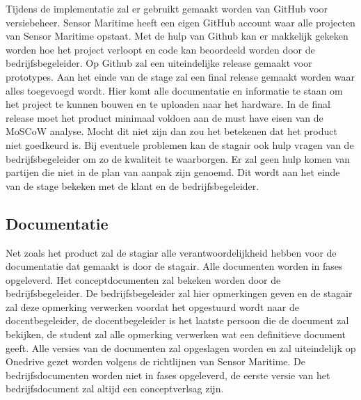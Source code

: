 \noindent Tijdens de implementatie zal er gebruikt gemaakt worden van GitHub voor versiebeheer. Sensor Maritime heeft een eigen GitHub account waar alle projecten van Sensor Maritime opstaat. Met de hulp van Github kan er makkelijk gekeken worden hoe het project verloopt en code kan beoordeeld worden door de bedrijfsbegeleider. Op Github zal een uiteindelijke release gemaakt voor prototypes. Aan het einde van de stage zal een final release gemaakt worden waar alles toegevoegd wordt. Hier komt alle documentatie en informatie te staan om het project te kunnen bouwen en te uploaden naar het hardware. In de final release moet het product minimaal voldoen aan de must have eisen van de MoSCoW analyse. Mocht dit niet zijn dan zou het betekenen dat het product niet goedkeurd is. Bij eventuele problemen kan de stagair ook hulp vragen van de bedrijfsbegeleider om zo de kwaliteit te waarborgen. Er zal geen hulp komen van partijen die niet in de plan van aanpak zijn genoemd. Dit wordt aan het einde van de stage bekeken met de klant en de bedrijfsbegeleider.

\subsection{Documentatie}
Net zoals het product zal de stagiar alle verantwoordelijkheid hebben voor de documentatie dat gemaakt is door de stagair. Alle documenten worden in fases opgeleverd. Het conceptdocumenten zal bekeken worden door de bedrijfsbegeleider. De bedrijfsbegeleider zal hier opmerkingen geven en de stagair zal deze opmerking verwerken voordat het opgestuurd wordt naar de docentbegeleider, de docentbegeleider is het laatste persoon die de document zal bekijken, de student zal alle opmerking verwerken wat een definitieve document geeft. Alle versies van de documenten zal opgeslagen worden en zal uiteindelijk op Onedrive gezet worden volgens de richtlijnen van Sensor Maritime. De bedrijfsdocumenten worden niet in fases opgeleverd, de eerste versie van het bedrijfsdocument zal altijd een conceptverlsag zijn.